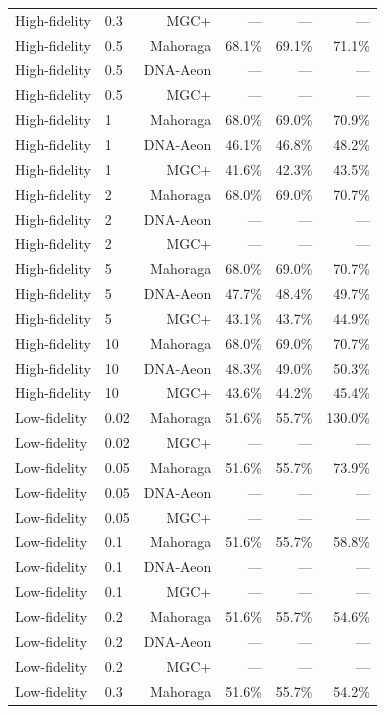 \begin{table}[H]
\begin{tabular}{llrrrr}
High-fidelity & 0.3 & MGC+ & --- & --- & --- \\
High-fidelity & 0.5 & Mahoraga & 68.1\% & 69.1\% & 71.1\% \\
High-fidelity & 0.5 & DNA-Aeon & --- & --- & --- \\
High-fidelity & 0.5 & MGC+ & --- & --- & --- \\
High-fidelity & 1 & Mahoraga & 68.0\% & 69.0\% & 70.9\% \\
High-fidelity & 1 & DNA-Aeon & 46.1\% & 46.8\% & 48.2\% \\
High-fidelity & 1 & MGC+ & 41.6\% & 42.3\% & 43.5\% \\
High-fidelity & 2 & Mahoraga & 68.0\% & 69.0\% & 70.7\% \\
High-fidelity & 2 & DNA-Aeon & --- & --- & --- \\
High-fidelity & 2 & MGC+ & --- & --- & --- \\
High-fidelity & 5 & Mahoraga & 68.0\% & 69.0\% & 70.7\% \\
High-fidelity & 5 & DNA-Aeon & 47.7\% & 48.4\% & 49.7\% \\
High-fidelity & 5 & MGC+ & 43.1\% & 43.7\% & 44.9\% \\
High-fidelity & 10 & Mahoraga & 68.0\% & 69.0\% & 70.7\% \\
High-fidelity & 10 & DNA-Aeon & 48.3\% & 49.0\% & 50.3\% \\
High-fidelity & 10 & MGC+ & 43.6\% & 44.2\% & 45.4\% \\
\midrule
Low-fidelity & 0.02 & Mahoraga & 51.6\% & 55.7\% & 130.0\% \\
Low-fidelity & 0.02 & MGC+ & --- & --- & --- \\
Low-fidelity & 0.05 & Mahoraga & 51.6\% & 55.7\% & 73.9\% \\
Low-fidelity & 0.05 & DNA-Aeon & --- & --- & --- \\
Low-fidelity & 0.05 & MGC+ & --- & --- & --- \\
Low-fidelity & 0.1 & Mahoraga & 51.6\% & 55.7\% & 58.8\% \\
Low-fidelity & 0.1 & DNA-Aeon & --- & --- & --- \\
Low-fidelity & 0.1 & MGC+ & --- & --- & --- \\
Low-fidelity & 0.2 & Mahoraga & 51.6\% & 55.7\% & 54.6\% \\
Low-fidelity & 0.2 & DNA-Aeon & --- & --- & --- \\
Low-fidelity & 0.2 & MGC+ & --- & --- & --- \\
Low-fidelity & 0.3 & Mahoraga & 51.6\% & 55.7\% & 54.2\% \\

\end{tabular}
\end{table}
